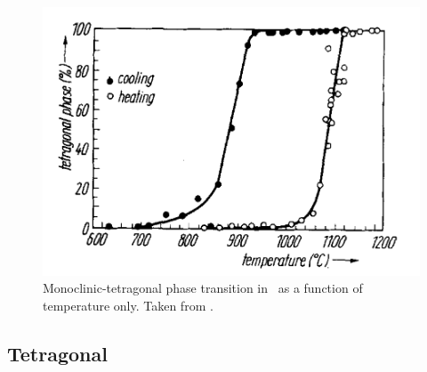 \begin{figure}[htp] %
\centering
\includegraphics[width=12cm]{images/hysteresis_monotet.png}
\caption[Monoclinic-tetragonal phase transition in \zirconia\ as a function of temperature only.]{Monoclinic-tetragonal phase transition in \zirconia\ as a function of temperature only. Taken from \cite{WOLTEN1963}.}
\label{figure:hysteresis_monotet}
\end{figure}







\subsection{Tetragonal}

